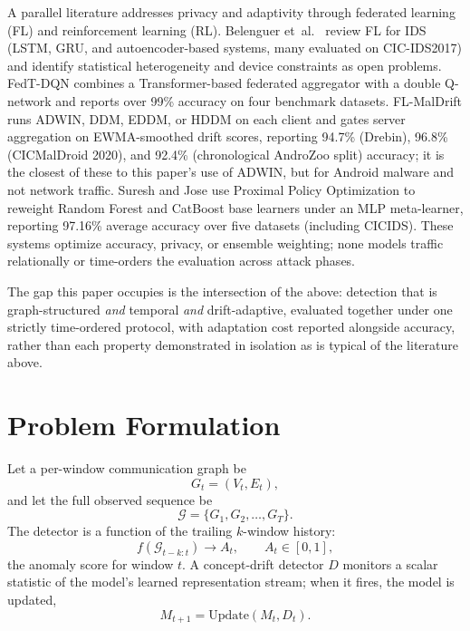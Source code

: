 \documentclass[twocolumn]{llncs}
\begin{document}
A parallel literature addresses privacy and adaptivity through federated learning (FL) and
reinforcement learning (RL). Belenguer et~al.\ \cite{belenguer2025flreview} review FL for IDS
(LSTM, GRU, and autoencoder-based systems, many evaluated on CIC-IDS2017) and identify statistical
heterogeneity and device constraints as open problems. FedT-DQN \cite{ma2025fedtdqn} combines a
Transformer-based federated aggregator with a double Q-network and reports over 99\% accuracy on four
benchmark datasets. FL-MalDrift \cite{patel2026fmaldrift} runs ADWIN, DDM, EDDM, or HDDM on each
client and gates server aggregation on EWMA-smoothed drift scores, reporting 94.7\% (Drebin), 96.8\%
(CICMalDroid 2020), and 92.4\% (chronological AndroZoo split) accuracy; it is the closest of these to
this paper's use of ADWIN, but for Android malware and not network traffic. Suresh and Jose
\cite{suresh2025ppo} use Proximal Policy Optimization to reweight Random Forest and CatBoost base
learners under an MLP meta-learner, reporting 97.16\% average accuracy over five datasets (including
CICIDS). These systems optimize accuracy, privacy, or ensemble weighting; none models traffic
relationally or time-orders the evaluation across attack phases.

\medskip
The gap this paper occupies is the intersection of the above: detection that is graph-structured
\emph{and} temporal \emph{and} drift-adaptive, evaluated together under one strictly time-ordered
protocol, with adaptation cost reported alongside accuracy, rather than each property demonstrated
in isolation as is typical of the literature above.

\section{Problem Formulation}
\label{sec:problem}

Let a per-window communication graph be
\begin{equation}
G_t = (V_t, E_t),
\end{equation}
and let the full observed sequence be
\begin{equation}
\mathcal{G} = \{G_1, G_2, \ldots, G_T\}.
\end{equation}
The detector is a function of the trailing $k$-window history:
\begin{equation}
f(\mathcal{G}_{t-k:t}) \rightarrow A_t, \qquad A_t \in [0,1],
\label{eq:anomaly-score}
\end{equation}
the anomaly score for window $t$. A concept-drift detector $D$ monitors a scalar statistic of the
model's learned representation stream; when it fires, the model is updated,
\begin{equation}
M_{t+1} = \mathrm{Update}(M_t, D_t).
\label{eq:update}
\end{equation}
\end{document}
